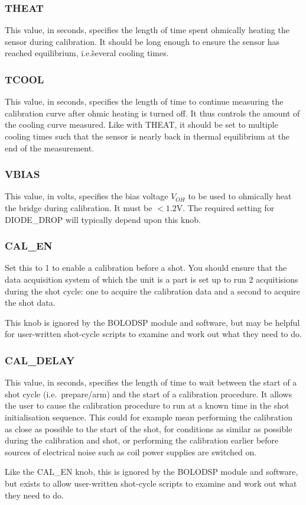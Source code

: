 \documentclass[12pt,a4paper]{article}
\begin{document}
\subsubsection{THEAT}
This value, in seconds, specifies the length of time spent ohmically heating the sensor during calibration. It should be long enough to ensure the sensor
has reached equilibrium, i.e.\~several cooling times.

\subsubsection{TCOOL}
This value, in seconds, specifies the length of time to continue measuring the calibration curve after ohmic heating is turned off. It thus controls the
amount of the cooling curve measured. Like with THEAT, it should be set to multiple cooling times such that the sensor is nearly back in thermal
equilibrium at the end of the measurement.

\subsubsection{VBIAS}
This value, in volts, specifies the bias voltage $V_{OH}$ to be used to ohmically heat the bridge during calibration. It must be $<1.2\mathrm{V}$. The
required setting for DIODE{\_}DROP will typically depend upon this knob.

\subsubsection{CAL{\_}EN}
Set this to 1 to enable a calibration before a shot. You should ensure that the data acquisition system of which the unit is a part is set up to run 2
acquitisions during the shot cycle: one to acquire the calibration data and a second to acquire the shot data.

This knob is ignored by the BOLODSP module and software, but may be helpful for user-written shot-cycle scripts to examine and work out what they need to
do.

\subsubsection{CAL{\_}DELAY}
This value, in seconds, specifies the length of time to wait between the start of a shot cycle (i.e.~prepare/arm) and the start of a calibration
procedure. It allows the user to cause the calibration procedure to run at a known time in the shot initialisation sequence. This could for example mean
performing the calibration as close as possible to the start of the shot, for conditions as similar as possible during the calibration and shot, or
performing the calibration earlier before sources of electrical noise such as coil power supplies are switched on.

Like the CAL{\_}EN knob, this is ignored by the BOLODSP module and software, but exists to allow user-written shot-cycle scripts to examine and work out
what they need to do.



\end{document}
